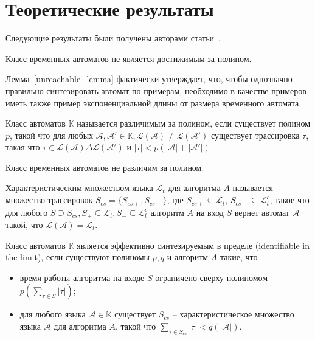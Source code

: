 \documentclass[times,specification,annotation]{itmo-student-thesis}
\begin{document}
\section{Теоретические результаты}
Следующие результаты были получены авторами статьи~\cite{1-dta}.

\begin{lemma}
  Класс временных автоматов не является достижимым за полином.
  \label{unreachable_lemma}
\end{lemma}

Лемма~\ref{unreachable_lemma} фактически утверждает, что, чтобы однозначно правильно синтезировать 
автомат по примерам, необходимо в качестве примеров иметь также пример экспоненциальной длины от размера временного автомата.

\begin{definition}
  Класс автоматов $\mathbb{K}$ называется различимым за полином, если существует полином $p$, такой что для любых
  $\mathcal{A}, \mathcal{A'} \in \mathbb{K}, \mathcal{L}(\mathcal{A}) \neq \mathcal{L}(\mathcal{A'})$ существует трассировка $\tau$, такая что 
  $\tau \in \mathcal{L}(\mathcal{A}) \Delta \mathcal{L}(\mathcal{A'})$ и $|\tau| < p(|\mathcal{A}| + |\mathcal{A'}|)$
\end{definition}

\begin{lemma}
  Класс временных автоматов не различим за полином.
  \label{distinguishability_lemma}
\end{lemma}

\begin{definition}
    Характеристическим множеством языка $\mathcal{L}_t$ для алгоритма $A$ называется множество трассировок $S_{cs} = \{S_{cs+}, S_{cs-}\}$, где
  $S_{cs+} \subseteq \mathcal{L}_t$, $S_{cs-} \subseteq \mathcal{L}_t^c$, такое что 
  для любого $S \supseteq S_{cs}, S_+ \subseteq \mathcal{L}_t, S_- \subseteq \mathcal{L}_t^c$ алгоритм $A$ на вход $S$ вернет автомат $\mathcal{A}$ такой, что $\mathcal{L}(\mathcal{A}) = \mathcal{L}_t$.
\end{definition}

\begin{definition}
  Класс автоматов $\mathbb{K}$ является эффективно синтезируемым в пределе (identifiable in the limit), если существуют полиномы $p, q$ и алгоритм $A$ такие, что
  \begin{itemize}
    \item время работы алгоритма на входе $S$ ограничено сверху полиномом $p(\mathop{\sum}\limits_{\tau \in S}|\tau|)$;
    \item для любого языка $\mathcal{A} \in \mathbb{K}$ существует $S_{cs} $ 
      -- характеристическое множество языка $\mathcal{A}$ для алгоритма $A$, такой что $\mathop{\sum}\limits_{\tau \in S_{cs}}|\tau| < q(|\mathcal{A}|)$.
  \end{itemize}
\end{definition}
\end{document}
